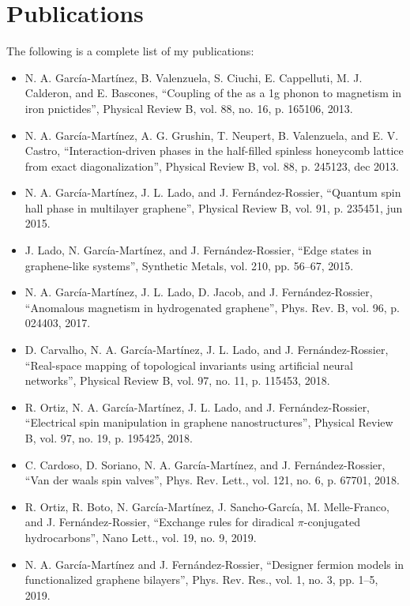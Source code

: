\chapter{Publications}
The following is a complete list of my publications:

\begin{itemize}
   \item N. A. García-Martínez, B. Valenzuela, S. Ciuchi, E. Cappelluti, M. J. Calderon, and E. Bascones, ``Coupling of the as a 1g phonon to magnetism in iron pnictides'', Physical Review B, vol. 88, no. 16, p. 165106, 2013.

   \item N. A. García-Martínez, A. G. Grushin, T. Neupert, B. Valenzuela, and E. V. Castro, ``Interaction-driven phases in the half-filled spinless honeycomb lattice from exact diagonalization'', Physical Review B, vol. 88, p. 245123, dec 2013.

   \item N. A. García-Martínez, J. L. Lado, and J. Fernández-Rossier, ``Quantum spin hall phase in multilayer graphene'', Physical Review B, vol. 91, p. 235451, jun 2015.

   \item J. Lado, N. García-Martínez, and J. Fernández-Rossier, ``Edge states in
graphene-like systems'', Synthetic Metals, vol. 210, pp. 56–67, 2015.

   \item N. A. García-Martínez, J. L. Lado, D. Jacob, and J. Fernández-Rossier, ``Anomalous magnetism in hydrogenated graphene'', Phys. Rev. B, vol. 96, p. 024403, 2017.

   \item D. Carvalho, N. A. García-Martínez, J. L. Lado, and J. Fernández-Rossier, ``Real-space mapping of topological invariants using artificial neural networks'', Physical Review B, vol. 97, no. 11, p. 115453, 2018.

   \item R. Ortiz, N. A. García-Martínez, J. L. Lado, and J. Fernández-Rossier, ``Electrical spin manipulation in graphene nanostructures'', Physical Review B, vol. 97, no. 19, p. 195425, 2018.

   \item C. Cardoso, D. Soriano, N. A. García-Martínez, and J. Fernández-Rossier, ``Van der waals spin valves'', Phys. Rev. Lett., vol. 121, no. 6, p. 67701, 2018.

   \item R. Ortiz, R. Boto, N. García-Martínez, J. Sancho-García, M. Melle-Franco, and J. Fernández-Rossier, ``Exchange rules for diradical $\pi$-conjugated hydrocarbons'', Nano Lett., vol. 19, no. 9, 2019.

   \item N. A. García-Martínez and J. Fernández-Rossier, ``Designer fermion models in functionalized graphene bilayers'', Phys. Rev. Res., vol. 1, no. 3, pp. 1–5, 2019.
\end{itemize}
